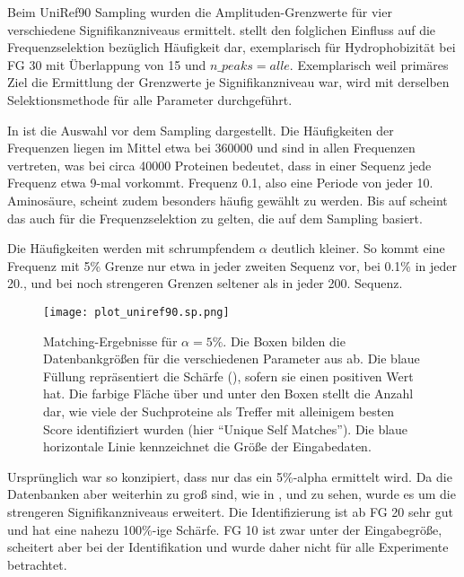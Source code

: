         Beim UniRef90 Sampling wurden die Amplituden-Grenzwerte für vier verschiedene Signifikanzniveaus ermittelt.  stellt den folglichen Einfluss auf die Frequenzselektion bezüglich Häufigkeit dar, exemplarisch für Hydrophobizität bei \ac{FG} 30 mit Überlappung von 15 und $n\_peaks = alle$. Exemplarisch weil primäres Ziel die Ermittlung der Grenzwerte je Signifikanzniveau war,  wird mit derselben Selektionsmethode für alle Parameter durchgeführt.

        In  ist die Auswahl vor dem Sampling dargestellt. Die Häufigkeiten der Frequenzen liegen im Mittel etwa bei 360000 und sind in allen Frequenzen vertreten, was bei circa 40000 Proteinen bedeutet, dass in einer Sequenz jede Frequenz etwa 9-mal vorkommt. Frequenz 0.1, also eine Periode von jeder 10. Aminosäure, scheint zudem besonders häufig gewählt zu werden. Bis auf  scheint das auch für die Frequenzselektion zu gelten, die auf dem Sampling basiert.

        Die Häufigkeiten werden mit schrumpfendem $\alpha$ deutlich kleiner. So kommt eine Frequenz mit 5\% Grenze nur etwa in jeder zweiten Sequenz vor, bei 0.1\% in jeder 20., und bei noch strengeren Grenzen seltener als in jeder 200. Sequenz.

        \begin{figure}[H]
            \centering
            \texttt{[image: plot\_uniref90.sp.png]}
            \caption[Single-Protein-Matching ]{Matching-Ergebnisse für $\alpha=5\%$. Die Boxen bilden die Datenbankgrößen für die verschiedenen Parameter aus  ab. Die blaue Füllung repräsentiert die Schärfe (), sofern sie einen positiven Wert hat. Die farbige Fläche über und unter den Boxen stellt die Anzahl dar, wie viele der Suchproteine als Treffer mit alleinigem besten Score identifiziert wurden (hier ``Unique Self Matches''). Die blaue horizontale Linie kennzeichnet die Größe der Eingabedaten.}
            \label{fig:uniref90.sp}
        \end{figure}

        Ursprünglich war  so konzipiert, dass nur das ein 5\%-alpha ermittelt wird. Da die Datenbanken aber weiterhin zu groß sind, wie in ,  und  zu sehen, wurde es um die strengeren Signifikanzniveaus erweitert. Die Identifizierung ist ab \ac{FG} 20 sehr gut und hat eine nahezu 100\%-ige Schärfe. \ac{FG} 10 ist zwar unter der Eingabegröße, scheitert aber bei der Identifikation und wurde daher nicht für alle Experimente betrachtet. 
    
